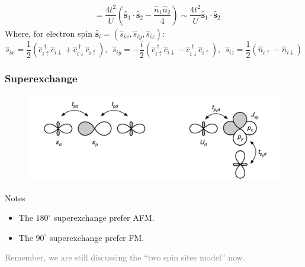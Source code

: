 \documentclass{beamer}
\begin{document}
\begin{frame}
\begin{equation}
\begin{aligned}
        &= \dfrac{4t^2}{U} \left(\widehat{\bm{s}}_1\cdot\widehat{\bm{s}}_2 - \dfrac{\widehat{n}_1\widehat{n}_2}{4}\right) \sim \dfrac{4t^2}{U} \widehat{\bm{s}}_1\cdot\widehat{\bm{s}}_2
      \end{aligned} 
    \end{equation}
    Where, for electron spin \(\widehat{\bm{s}}_i = (\widehat{s}_{ix},\widehat{s}_{iy},\widehat{s}_{iz})\):
    \begin{equation}
      \widehat{s}_{ix} = \dfrac{1}{2}\left(\widehat{c}_{i\uparrow}^{\;\dagger}\widehat{c}_{i\downarrow}+\widehat{c}_{i\downarrow}^{\;\dagger}\widehat{c}_{i\uparrow}\right),\ \ 
      \widehat{s}_{iy} = -\dfrac{i}{2}\left(\widehat{c}_{i\uparrow}^{\;\dagger}\widehat{c}_{i\downarrow}-\widehat{c}_{i\downarrow}^{\;\dagger}\widehat{c}_{i\uparrow}\right),\ \ 
      \widehat{s}_{iz} = \dfrac{1}{2}\left(\widehat{n}_{i\uparrow} - \widehat{n}_{i\downarrow}\right)
    \end{equation}
  \end{frame}

  \begin{frame}
    \frametitle{Superexchange}
    \begin{figure}
      \centering
      \includegraphics[width=\textwidth]{figure/SupEx.png}
    \end{figure}
    \begin{block}{Notes}
      \begin{itemize}
        \item The \(180^{\circ}\) superexchange prefer AFM. 
        \item The \(90^{\circ}\) superexchange prefer FM. 
      \end{itemize}
    \end{block}
    \textcolor{gray}{Remember, we are still discussing the ``two spin sites model'' now.}
  \end{frame}
\end{document}
